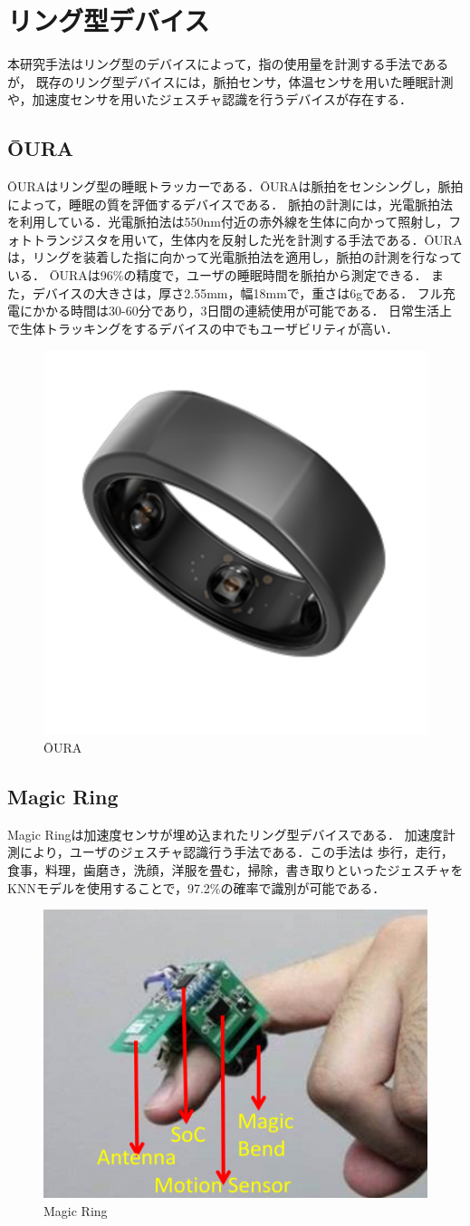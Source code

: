 \section{リング型デバイス}
本研究手法はリング型のデバイスによって，指の使用量を計測する手法であるが，
既存のリング型デバイスには，脈拍センサ，体温センサを用いた睡眠計測や，加速度センサを用いたジェスチャ認識を行うデバイスが存在する．
\subsection*{ŌURA}
ŌURA\cite{DeZambotti2017}はリング型の睡眠トラッカーである．ŌURAは脈拍をセンシングし，脈拍によって，睡眠の質を評価するデバイスである．
脈拍の計測には，光電脈拍法を利用している．光電脈拍法は550nm付近の赤外線を生体に向かって照射し，フォトトランジスタを用いて，生体内を反射した光を計測する手法である．ŌURAは，リングを装着した指に向かって光電脈拍法を適用し，脈拍の計測を行なっている．
ŌURAは96\%の精度で，ユーザの睡眠時間を脈拍から測定できる．
また，デバイスの大きさは，厚さ2.55mm，幅18mmで，重さは6gである．
フル充電にかかる時間は30-60分であり，3日間の連続使用が可能である．
日常生活上で生体トラッキングをするデバイスの中でもユーザビリティが高い．
\begin{figure}[H]
  \centering
  \includegraphics[width=0.4\linewidth]{fig/ch1/oura}
  \caption{ŌURA\cite{DeZambotti2017}}
  \label{fig:oura}
\end{figure}

\subsection*{Magic Ring}
Magic Ring\cite{Wang2013}は加速度センサが埋め込まれたリング型デバイスである．
加速度計測により，ユーザのジェスチャ認識行う手法である．この手法は
歩行，走行，食事，料理，歯磨き，洗顔，洋服を畳む，掃除，書き取りといったジェスチャをKNNモデルを使用することで，97.2\%の確率で識別が可能である．
\begin{figure}[H]
  \centering
  \includegraphics[width=0.6\linewidth]{fig/ch1/magicring}
  \caption{Magic Ring\cite{Wang2013}}
  \label{fig:magicring}
\end{figure}

